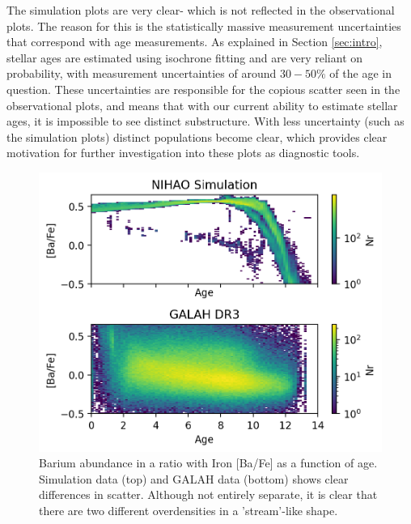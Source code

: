 \documentclass[fleqn,usenatbib]{mnras}
\begin{document}
The simulation plots are very clear- which is not reflected in the observational plots. The reason for this is the statistically massive measurement uncertainties that correspond with age measurements. As explained in Section \ref{sec:intro}, stellar ages are estimated using isochrone fitting and are very reliant on probability, with measurement uncertainties of around $30-50\%$ of the age in question. These uncertainties are responsible for the copious scatter seen in the observational plots, and means that with our current ability to estimate stellar ages, it is impossible to see distinct substructure. With less uncertainty (such as the simulation plots) distinct populations become clear, which provides clear motivation for further investigation into these plots as diagnostic tools. 
\begin{figure}
	\includegraphics[width=\columnwidth]{figures/Ba_Fe_time.png}
    \caption{Barium abundance in a ratio with Iron [Ba/Fe] as a function of age. Simulation data (top) and GALAH data (bottom) shows clear differences in scatter. Although not entirely separate, it is clear that there are two different overdensities in a 'stream'-like shape.}
    \label{fig:BaFetime}
\end{figure}
\end{document}
